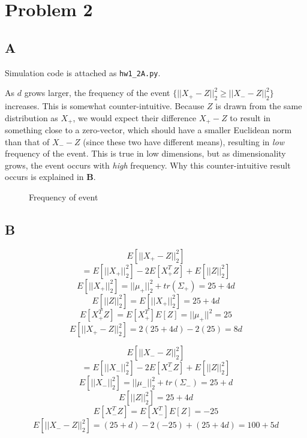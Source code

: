 \documentclass{article}
\begin{document}
\section*{Problem 2}

\subsection*{A}

Simulation code is attached as \texttt{hw1\_2A.py}. 

\smallskip

As $d$ grows larger, the frequency of the event $\{||X_+ -
Z||^2_2 \geq ||X_{-} - Z||_2^2\}$ increases. This is somewhat counter-intuitive.
Because $Z$ is drawn from the same distribution as $X_+$, we would expect their
difference $X_+ - Z$ to result in something close to a zero-vector, which should
have a smaller Euclidean norm than that of $X_- - Z$
(since these two have different
means), resulting in \textit{low} frequency of the event. This is true in low
dimensions, but as dimensionality grows, the event occurs with \textit{high}
frequency. Why this counter-intuitive result occurs is explained in \textbf{B}.

\begin{figure}[h!]
	\centering
	\caption{Frequency of event}
\end{figure}

\subsection*{B}

$$ E[||X_+ - Z||^2_2] $$
$$ = E[||X_+||_2^2] -2E[X_+^TZ] + E[||Z||^2_2] $$
$$ E[||X_+||^2_2] = ||\mu_+||^2_2 + tr(\Sigma_+) = 25 + 4d$$
$$ E[||Z||^2_2] = E[||X_+||^2_2] = 25 + 4d$$
$$
E[X_+^TZ] = E[X_+^T]E[Z] = ||\mu_+||^2 = 25
$$
$$
E[||X_+ - Z||^2_2] = 2(25+4d) - 2(25) = \boxed{8d}
$$

\medskip

$$ E[||X_- - Z||^2_2] $$
$$ = E[||X_-||_2^2] -2E[X_-^TZ] + E[||Z||^2_2] $$
$$ E[||X_-||^2_2] = ||\mu_-||^2_2 + tr(\Sigma_-) = 25 + d$$
$$ E[||Z||^2_2] = 25 + 4d$$
$$ E[X_-^TZ] = E[X_-^T]E[Z] = -25$$
$$E[||X_- - Z||^2_2] = (25+d) - 2(-25) + (25+4d) = \boxed{100+5d}$$
\end{document}
